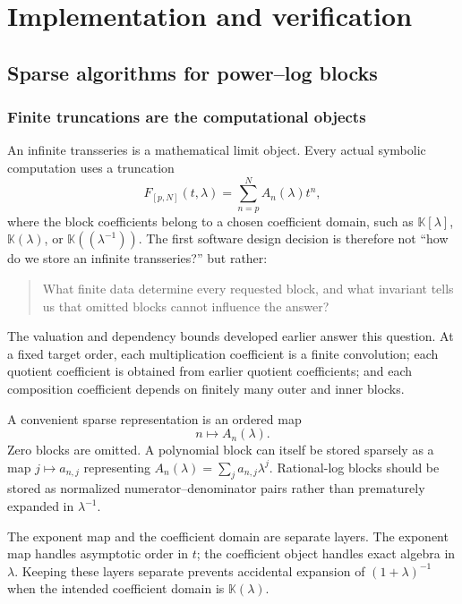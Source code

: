 \documentclass[11pt,openany]{book}
\theoremstyle{definition}
\theoremstyle{plain}
\theoremstyle{remark}
\newcommand{\K}{\mathbb{K}}
\begin{document}
\part{Implementation and verification}\label{part:implementation}

\chapter{Sparse algorithms for power--log blocks}\label{ch:implementation}

\section{Finite truncations are the computational objects}
An infinite transseries is a mathematical limit object. Every actual symbolic computation uses a truncation
\begin{equation}\label{eq:finite-truncation-data}
 F_{[p,N]}(t,\lambda)=\sum_{n=p}^{N} A_n(\lambda)t^n,
\end{equation}
where the block coefficients belong to a chosen coefficient domain, such as \(\K[\lambda]\), \(\K(\lambda)\), or \(\K((\lambda^{-1}))\). The first software design decision is therefore not ``how do we store an infinite transseries?'' but rather:
\begin{quote}
What finite data determine every requested block, and what invariant tells us that omitted blocks cannot influence the answer?
\end{quote}
The valuation and dependency bounds developed earlier answer this question. At a fixed target order, each multiplication coefficient is a finite convolution; each quotient coefficient is obtained from earlier quotient coefficients; and each composition coefficient depends on finitely many outer and inner blocks.

A convenient sparse representation is an ordered map
\[
 n\longmapsto A_n(\lambda).
\]
Zero blocks are omitted. A polynomial block can itself be stored sparsely as a map \(j\mapsto a_{n,j}\) representing \(A_n(\lambda)=\sum_j a_{n,j}\lambda^j\). Rational-log blocks should be stored as normalized numerator--denominator pairs rather than prematurely expanded in \(\lambda^{-1}\).


\begin{checkpointbox}
The exponent map and the coefficient domain are separate layers. The exponent map handles asymptotic order in \(t\); the coefficient object handles exact algebra in \(\lambda\). Keeping these layers separate prevents accidental expansion of \((1+\lambda)^{-1}\) when the intended coefficient domain is \(\K(\lambda)\).
\end{checkpointbox}
\end{document}

